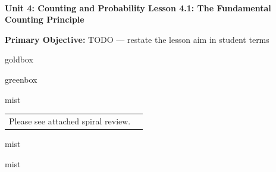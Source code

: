 \documentclass[10pt]{article}
\newcommand{\UnitNumberName}{Unit 4: Counting and Probability \quad}
\newcommand{\LessonNumberName}{Lesson 4.1: The Fundamental Counting Principle}
\begin{document}
\begin{center}
    {\Large\bfseries \CourseName \\
    {\small\bfseries \UnitNumberName \LessonNumberName}}
\end{center}

\begin{tcolorbox}[colback=mist, colframe=royal, boxrule=0.9pt, arc=2mm,
    left=2mm, right=2mm, top=1.5mm, bottom=1.5mm]
    \textbf{Primary Objective:} TODO --- restate the lesson aim in student terms
\end{tcolorbox}

\renewcommand{\arraystretch}{1.6}
\begin{skillbox}{goldbox}
\end{skillbox}

\begin{skillbox}{greenbox}
\end{skillbox}

\begin{fixedskillbox}{mist}
    \begin{tabularx}{\linewidth}{@{}X c@{}}
        \begin{minipage}[t]{0.55\linewidth}\vspace{0pt}
            Please see attached spiral review.  %
        \end{minipage}
        &
        \begin{minipage}[t]{0.38\linewidth}\vspace{0pt}\centering
        \end{minipage}
    \end{tabularx}
\end{fixedskillbox}

\begin{skillbox}[Hook]{mist}
\end{skillbox}

\begin{skillbox}[Lesson]{mist}
\end{skillbox}
\end{document}
